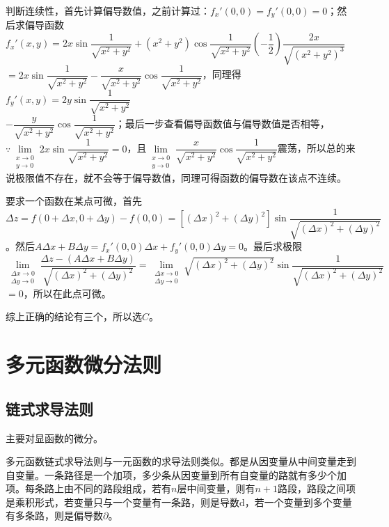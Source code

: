 \documentclass[UTF8, 12pt]{ctexart}
\begin{document}
        判断连续性，首先计算偏导数值，之前计算过：$f_x'(0,0)=f_y'(0,0)=0$；然后求偏导函数$f_x'(x,y)=2x\sin\dfrac{1}{\sqrt{x^2+y^2}}+(x^2+y^2)\cos\dfrac{1}{\sqrt{x^2+y^2}}\left(-\dfrac{1}{2}\right)\dfrac{2x}{\sqrt{(x^2+y^2)^3}}$\\$=2x\sin\dfrac{1}{\sqrt{x^2+y^2}}-\dfrac{x}{\sqrt{x^2+y^2}}\cos\dfrac{1}{\sqrt{x^2+y^2}}$，同理得$f_y'(x,y)=2y\sin\dfrac{1}{\sqrt{x^2+y^2}}$\\$-\dfrac{y}{\sqrt{x^2+y^2}}\cos\dfrac{1}{\sqrt{x^2+y^2}}$；最后一步查看偏导函数值与偏导数值是否相等，$\because\lim\limits_{\substack{x\to0\\y\to0}}2x\sin\dfrac{1}{\sqrt{x^2+y^2}}=0$，且$\lim\limits_{\substack{x\to0\\y\to0}}\dfrac{x}{\sqrt{x^2+y^2}}\cos\dfrac{1}{\sqrt{x^2+y^2}}$震荡，所以总的来说极限值不存在，就不会等于偏导数值，同理可得函数的偏导数在该点不连续。

        要求一个函数在某点可微，首先$\Delta z=f(0+\Delta x,0+\Delta y)-f(0,0)=[(\Delta x)^2+(\Delta y)^2]\sin\dfrac{1}{\sqrt{(\Delta x)^2+(\Delta y)^2}}$。然后$A\Delta x+B\Delta y=f_x'(0,0)\Delta x+f_y'(0,0)\Delta y=0$。最后求极限$\lim\limits_{\substack{\Delta x\to0\\\Delta y\to0}}\dfrac{\Delta z-(A\Delta x+B\Delta y)}{\sqrt{(\Delta x)^2+(\Delta y)^2}}=\lim\limits_{\substack{\Delta x\to0\\\Delta y\to0}}\sqrt{(\Delta x)^2+(\Delta y)^2}\sin\dfrac{1}{\sqrt{(\Delta x)^2+(\Delta y)^2}}$\\$=0$，所以在此点可微。

        综上正确的结论有三个，所以选$C$。

        \section{多元函数微分法则}

        \subsection{链式求导法则}

        主要对显函数的微分。

        多元函数链式求导法则与一元函数的求导法则类似。都是从因变量从中间变量走到自变量。一条路径是一个加项，多少条从因变量到所有自变量的路就有多少个加项。每条路上由不同的路段组成，若有$n$层中间变量，则有$n+1$路段，路段之间项是乘积形式，若变量只与一个变量有一条路，则是导数$\textrm{d}$，若一个变量到多个变量有多条路，则是偏导数$\partial$。
\end{document}
